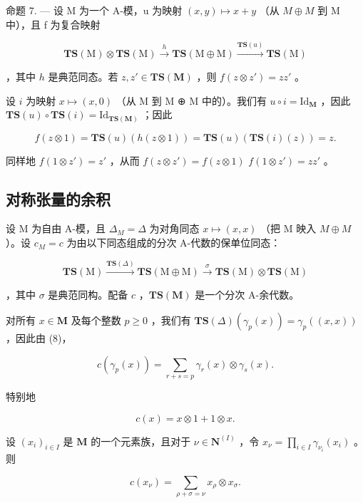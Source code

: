 命题 7. --- 设 M 为一个 A-模，u 为映射 \((x, y) \mapsto x + y\) （从 \(M \oplus M\) 到 M 中），且 f 为复合映射

\[
\mathbf {T S} (\mathrm{M}) \otimes \mathbf {T S} (\mathrm{M}) \xrightarrow {h} \mathbf {T S} (\mathrm{M} \oplus \mathrm{M}) \xrightarrow {\mathbf {T S} (u)} \mathbf {T S} (\mathrm{M})
\]

，其中 \(h\) 是典范同态。若 \(z, z' \in \mathbf{TS}(\mathbf{M})\) ，则 \(f(z \otimes z') = zz'\) 。

设 \(i\) 为映射 \(x \mapsto (x, 0)\) （从 M 到 M ⊕ M 中的）。我们有 \(u \circ i = \mathrm{Id}_{\mathbf{M}}\) ，因此 \(\mathbf{TS}(u) \circ \mathbf{TS}(i) = \mathrm{Id}_{\mathbf{TS}(\mathbf{M})}\) ；因此

\[
f (z \otimes 1) = \mathbf {T S} (u) (h (z \otimes 1)) = \mathbf {T S} (u) (\mathbf {T S} (i) (z)) = z.
\]

同样地 \(f(1 \otimes z') = z'\) ，从而 \(f(z \otimes z') = f(z \otimes 1)\) \(f(1 \otimes z') = zz'\) 。

\subsection{对称张量的余积}

设 M 为自由 A-模，且 \(\Delta_{M} = \Delta\) 为对角同态 \(x \mapsto (x, x)\) （把 M 映入 \(M \oplus M\) ）。设 \(c_{M} = c\) 为由以下同态组成的分次 A-代数的保单位同态：

\[
\mathbf {T S} (\mathrm{M}) \xrightarrow {\mathbf {T S} (\Delta)} \mathbf {T S} (\mathrm{M} \oplus \mathrm{M}) \xrightarrow {\sigma} \mathbf {T S} (\mathrm{M}) \otimes \mathbf {T S} (\mathrm{M})
\]

，其中 \(\sigma\) 是典范同构。配备 \(c\) ，\(\mathbf{TS}(\mathbf{M})\) 是一个分次 A-余代数。

对所有 \(x \in \mathbf{M}\) 及每个整数 \(p \geqslant 0\) ，我们有 \(\mathbf{TS}(\Delta) (\gamma_p(x)) = \gamma_p((x, x))\) ，因此由 (8)，

\[
c \left(\gamma_ {p} (x)\right) = \sum_ {r + s = p} \gamma_ {r} (x) \otimes \gamma_ {s} (x).\tag{10}
\]

特别地

\[
c (x) = x \otimes 1 + 1 \otimes x.\tag{11}
\]

设 \((x_{i})_{i\in I}\) 是 \(\mathbf{M}\) 的一个元素族，且对于 \(\nu \in \mathbf{N}^{(I)}\) ，令 \(x_{\nu} = \prod_{i\in I}\gamma_{\nu_i}(x_i)\) 。则

\[
c \left(x _ {\nu}\right) = \sum_ {\rho + \sigma = \nu} x _ {\rho} \otimes x _ {\sigma}.\tag{12}
\]


